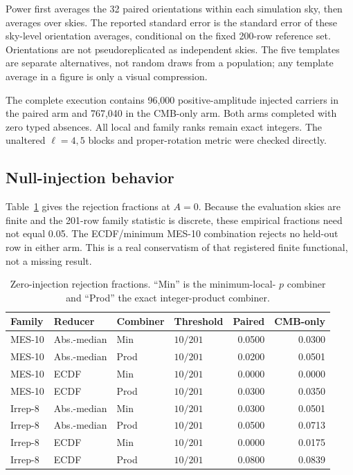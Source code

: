 \documentclass[11pt,a4paper]{article}
\begin{document}
Power first averages the 32 paired orientations within each simulation sky,
then averages over skies.  The reported standard error is the standard error
of these sky-level orientation averages, conditional on the fixed 200-row
reference set.  Orientations are not pseudoreplicated as independent skies.
The five templates are separate alternatives, not random draws from a
population; any template average in a figure is only a visual compression.

The complete execution contains 96,000 positive-amplitude injected carriers
in the paired arm and 767,040 in the CMB-only arm.  Both arms completed with
zero typed absences.  All local and family ranks remain exact integers.  The
unaltered $\ell=4,5$ blocks and proper-rotation metric were checked directly.

\subsection{Null-injection behavior}

Table~\ref{tab:power-baseline} gives the rejection fractions at $A=0$.
Because the evaluation skies are finite and the 201-row family statistic is
discrete, these empirical fractions need not equal 0.05.  The ECDF/minimum
MES-10 combination rejects no held-out row in either arm.  This is a real
conservatism of that registered finite functional, not a missing result.

\begin{table}[H]
\centering
\small
\caption{Zero-injection rejection fractions.  ``Min'' is the minimum-local-
$p$ combiner and ``Prod'' the exact integer-product combiner.}
\label{tab:power-baseline}
\begin{tabular}{@{}llllrr@{}}
\toprule
Family & Reducer & Combiner & Threshold & Paired & CMB-only\\
\midrule
MES-10 & Abs.-median & Min  & $10/201$ & 0.0500 & 0.0300\\
MES-10 & Abs.-median & Prod & $10/201$ & 0.0200 & 0.0501\\
MES-10 & ECDF        & Min  & $10/201$ & 0.0000 & 0.0000\\
MES-10 & ECDF        & Prod & $10/201$ & 0.0300 & 0.0350\\
Irrep-8 & Abs.-median & Min  & $10/201$ & 0.0300 & 0.0501\\
Irrep-8 & Abs.-median & Prod & $10/201$ & 0.0500 & 0.0713\\
Irrep-8 & ECDF        & Min  & $10/201$ & 0.0000 & 0.0175\\
Irrep-8 & ECDF        & Prod & $10/201$ & 0.0800 & 0.0839\\
\bottomrule
\end{tabular}
\end{table}
\end{document}
